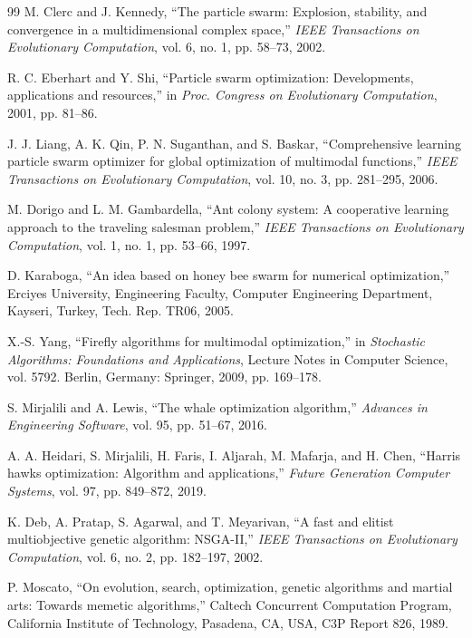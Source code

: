 \documentclass[journal]{IEEEtran}
\begin{document}
\begin{thebibliography}{99}
M. Clerc and J. Kennedy, ``The particle swarm: Explosion, stability, and convergence in a multidimensional complex space,'' \emph{IEEE Transactions on Evolutionary Computation}, vol. 6, no. 1, pp. 58--73, 2002.

R. C. Eberhart and Y. Shi, ``Particle swarm optimization: Developments, applications and resources,'' in \emph{Proc. Congress on Evolutionary Computation}, 2001, pp. 81--86.

J. J. Liang, A. K. Qin, P. N. Suganthan, and S. Baskar, ``Comprehensive learning particle swarm optimizer for global optimization of multimodal functions,'' \emph{IEEE Transactions on Evolutionary Computation}, vol. 10, no. 3, pp. 281--295, 2006.

M. Dorigo and L. M. Gambardella, ``Ant colony system: A cooperative learning approach to the traveling salesman problem,'' \emph{IEEE Transactions on Evolutionary Computation}, vol. 1, no. 1, pp. 53--66, 1997.

D. Karaboga, ``An idea based on honey bee swarm for numerical optimization,'' Erciyes University, Engineering Faculty, Computer Engineering Department, Kayseri, Turkey, Tech. Rep. TR06, 2005.

X.-S. Yang, ``Firefly algorithms for multimodal optimization,'' in \emph{Stochastic Algorithms: Foundations and Applications}, Lecture Notes in Computer Science, vol. 5792. Berlin, Germany: Springer, 2009, pp. 169--178.

S. Mirjalili and A. Lewis, ``The whale optimization algorithm,'' \emph{Advances in Engineering Software}, vol. 95, pp. 51--67, 2016.

A. A. Heidari, S. Mirjalili, H. Faris, I. Aljarah, M. Mafarja, and H. Chen, ``Harris hawks optimization: Algorithm and applications,'' \emph{Future Generation Computer Systems}, vol. 97, pp. 849--872, 2019.

K. Deb, A. Pratap, S. Agarwal, and T. Meyarivan, ``A fast and elitist multiobjective genetic algorithm: NSGA-II,'' \emph{IEEE Transactions on Evolutionary Computation}, vol. 6, no. 2, pp. 182--197, 2002.

P. Moscato, ``On evolution, search, optimization, genetic algorithms and martial arts: Towards memetic algorithms,'' Caltech Concurrent Computation Program, California Institute of Technology, Pasadena, CA, USA, C3P Report 826, 1989.


\end{thebibliography}
\end{document}
